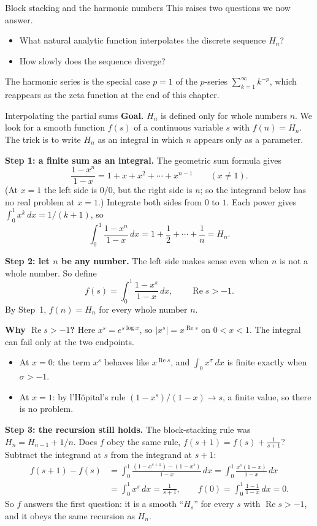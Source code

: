 \documentclass[11pt]{beamer}
\begin{document}
\begin{frame}[allowframebreaks=1.00]{Block stacking and the harmonic numbers}
This raises two questions we now answer.
\begin{itemize}
  \item What natural analytic function interpolates the discrete sequence \(H_n\)?
  \item How slowly does the sequence diverge?
\end{itemize}
The harmonic series is the special case \(p=1\) of the \(p\)-series
\(\sum_{k=1}^{\infty}k^{-p}\), which reappears as the zeta function at the end of this chapter.
\end{frame}


\begin{frame}[allowframebreaks=1.00]{Interpolating the partial sums}
\footnotesize
\textbf{Goal.} \(H_n\) is defined only for whole numbers \(n\). We look for a smooth function
\(f(s)\) of a continuous variable \(s\) with \(f(n)=H_n\). The trick is to write \(H_n\) as an
integral in which \(n\) appears only as a parameter.

\textbf{Step 1: a finite sum as an integral.} The geometric sum formula gives
\[
 \frac{1-x^n}{1-x}=1+x+x^2+\cdots+x^{n-1}\qquad(x\neq1).
\]
(At \(x=1\) the left side is \(0/0\), but the right side is \(n\); so the integrand below has no
real problem at \(x=1\).) Integrate both sides from \(0\) to \(1\). Each power gives
\(\int_0^1x^k\,dx=1/(k+1)\), so
\[
 \int_0^1\frac{1-x^n}{1-x}\,dx
 =1+\frac12+\cdots+\frac1n=H_n .
\]

\textbf{Step 2: let \(n\) be any number.} The left side makes sense even when \(n\) is not a whole
number. So define
\begin{equation}
 f(s)=\int_0^1\frac{1-x^s}{1-x}\,dx,\qquad \operatorname{Re}s>-1.
 \label{eq:harmonic-interp}
\end{equation}
By Step~1, \(f(n)=H_n\) for every whole number \(n\).


\textbf{Why \(\operatorname{Re}s>-1\)?} Here \(x^s=e^{s\log x}\), so \(|x^s|=x^{\operatorname{Re}s}\) on
\(0<x<1\). The integral can fail only at the two endpoints.
\begin{itemize}
  \item At \(x=0\): the term \(x^s\) behaves like \(x^{\operatorname{Re}s}\), and
        \(\int_0 x^\sigma\,dx\) is finite exactly when \(\sigma>-1\).
  \item At \(x=1\): by l'H\^opital's rule \((1-x^s)/(1-x)\to s\), a finite value, so there is no
        problem.
\end{itemize}

\textbf{Step 3: the recursion still holds.} The block-stacking rule was
\(H_n=H_{n-1}+1/n\). Does \(f\) obey the same rule, \(f(s+1)=f(s)+\frac1{s+1}\)? Subtract the integrand at
\(s\) from the integrand at \(s+1\):
\begin{align*}
 f(s+1)-f(s)&=\int_0^1\frac{(1-x^{s+1})-(1-x^s)}{1-x}\,dx
 =\int_0^1\frac{x^s(1-x)}{1-x}\,dx\\
 &=\int_0^1x^s\,dx=\frac1{s+1},\qquad f(0)=\int_0^1\frac{1-1}{1-x}\,dx=0.
\end{align*}
So \(f\) answers the first question: it is a smooth ``\(H_s\)'' for every \(s\) with \(\operatorname{Re}s>-1\), and it obeys
the same recursion as \(H_n\).


\end{frame}
\end{document}
